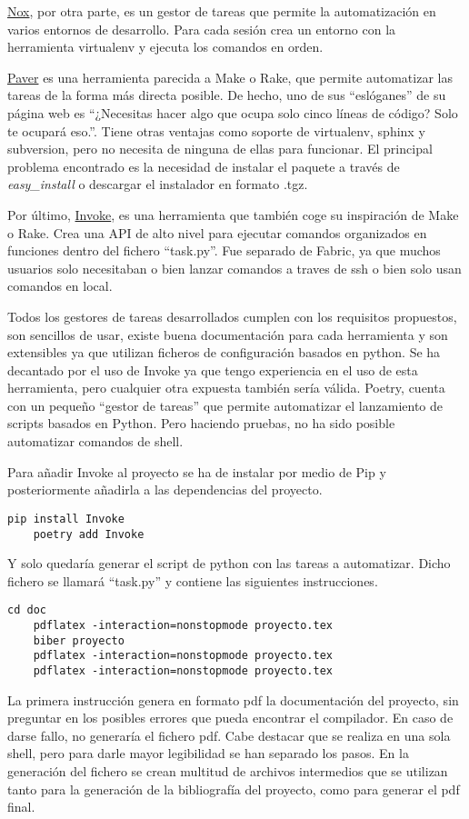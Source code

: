 \href{https://nox.thea.codes/en/stable/}{Nox}, por otra parte, es un gestor de tareas que permite la automatización en varios entornos de desarrollo. Para cada sesión crea un entorno con la herramienta virtualenv y ejecuta los comandos en orden.

\href{https://pythonhosted.org/Paver/}{Paver} es una herramienta parecida a Make o Rake, que permite automatizar las tareas de la forma más directa posible. De hecho, uno de sus ``eslóganes'' de su página web es ``¿Necesitas hacer algo que ocupa solo cinco líneas de código? Solo te ocupará eso.''. Tiene otras ventajas como soporte de virtualenv, sphinx y subversion, pero no necesita de ninguna de ellas para funcionar. El principal problema encontrado es la necesidad de instalar el paquete a través de \emph{easy_install} o descargar el instalador en formato \gls{.tgz}.

Por último, \href{https://www.pyinvoke.org/}{Invoke}, es una herramienta que también coge su inspiración de Make o Rake. Crea una \gls{API} de alto nivel para ejecutar comandos organizados en funciones dentro del fichero ``task.py''. Fue separado de Fabric, ya que muchos usuarios solo necesitaban o bien lanzar comandos a traves de ssh o bien solo usan comandos en local. 

Todos los gestores de tareas desarrollados cumplen con los requisitos propuestos, son sencillos de usar, existe buena documentación para cada herramienta y son extensibles ya que utilizan ficheros de configuración basados en \Gls{python}. Se ha decantado por el uso de Invoke ya que tengo experiencia en el uso de esta herramienta, pero cualquier otra expuesta también sería válida. Poetry, cuenta con un pequeño ``gestor de tareas'' que permite automatizar el lanzamiento de scripts basados en \Gls{Python}. Pero haciendo pruebas, no ha sido posible automatizar comandos de \Gls{shell}.

Para añadir Invoke al proyecto se ha de instalar por medio de Pip y posteriormente añadirla a las \glspl{dependencia} del proyecto.
\begin{lstlisting}[style=consola]
	pip install Invoke
	poetry add Invoke
\end{lstlisting}

Y solo quedaría generar el \gls{script} de python con las tareas a automatizar. Dicho fichero se llamará ``task.py'' y contiene las siguientes instrucciones. 

\begin{lstlisting}[style=consola]
	cd doc
	pdflatex -interaction=nonstopmode proyecto.tex
	biber proyecto
	pdflatex -interaction=nonstopmode proyecto.tex
	pdflatex -interaction=nonstopmode proyecto.tex
\end{lstlisting}
La primera instrucción genera en formato pdf la documentación del proyecto, sin preguntar en los posibles errores que pueda encontrar el compilador. En caso de darse fallo, no generaría el fichero pdf. Cabe destacar que se realiza en una sola \gls{shell}, pero para darle mayor legibilidad se han separado los pasos. En la generación del fichero se crean multitud de archivos intermedios que se utilizan tanto para la generación de la bibliografía del proyecto, como para generar el pdf final. 

